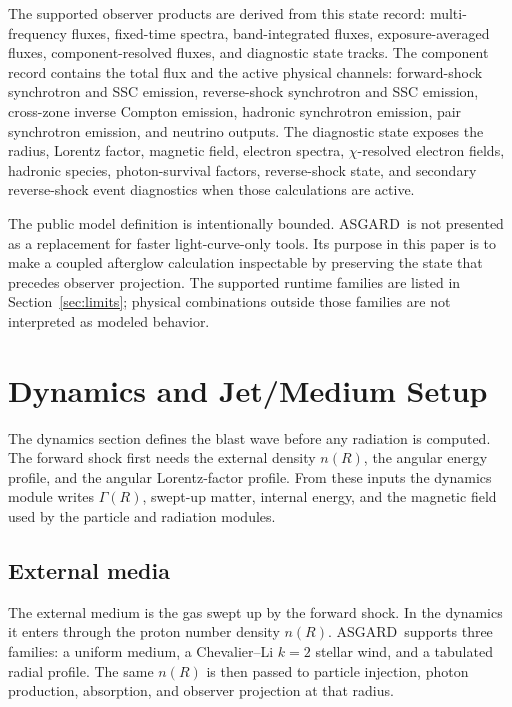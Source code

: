 \documentclass[twocolumn]{aastex702}
\newcommand{\asgard}{\textsc{ASGARD}}
\begin{document}
The supported observer products are derived from this state record: multi-frequency
fluxes, fixed-time spectra, band-integrated fluxes, exposure-averaged fluxes,
component-resolved fluxes, and diagnostic state tracks.  The component record
contains the total flux and the active physical channels: forward-shock
synchrotron and SSC emission, reverse-shock synchrotron and SSC emission,
cross-zone inverse Compton emission, hadronic synchrotron emission, pair
synchrotron emission, and neutrino outputs.  The diagnostic state exposes the
radius, Lorentz factor, magnetic field, electron spectra, \(\chi\)-resolved
electron fields, hadronic species, photon-survival factors, reverse-shock state,
and secondary reverse-shock event diagnostics when those calculations are active.

The public model definition is intentionally bounded.  \asgard\ is not presented
as a replacement for faster light-curve-only tools.  Its purpose in this paper is
to make a coupled afterglow calculation inspectable by preserving the state that
precedes observer projection.  The supported runtime families are listed in
Section~\ref{sec:limits}; physical combinations outside those families are not
interpreted as modeled behavior.

\section{Dynamics and Jet/Medium Setup} \label{sec:dynamics}

The dynamics section defines the blast wave before any radiation is computed.
The forward shock first needs the external density \(n(R)\), the angular energy
profile, and the angular Lorentz-factor profile.  From these inputs the dynamics
module writes \(\Gamma(R)\), swept-up matter, internal energy, and the magnetic
field used by the particle and radiation modules.

\subsection{External media}

The external medium is the gas swept up by the forward shock.  In the dynamics it
enters through the proton number density \(n(R)\).  \asgard\ supports three
families: a uniform medium, a Chevalier--Li \(k=2\) stellar wind, and a tabulated
radial profile.  The same \(n(R)\) is then passed to particle injection, photon
production, absorption, and observer projection at that radius.
\end{document}
